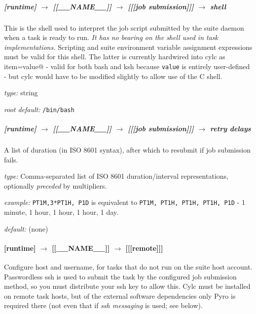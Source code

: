 \subparagraph[shell]{[runtime] $\rightarrow$ [[\_\_NAME\_\_]] $\rightarrow$ [[[job submission]]] $\rightarrow$ shell}
\label{JobSubShell}

This is the shell used to interpret the job script submitted by the suite
daemon when a task is ready to run.  {\em It has no bearing on the shell used
in task implementations.} Scripting and suite environment
variable assignment expressions must be valid for this shell. The
latter is currently hardwired into cylc as
\lstinline@export item=value@ - valid for both bash and ksh
because \lstinline=value= is entirely user-defined - but cylc would have
to be modified slightly to allow use of the C shell.

\begin{myitemize}
\item {\em type:} string
\item {\em root default:} \lstinline=/bin/bash=
\end{myitemize}

\subparagraph[retry delays]{[runtime] $\rightarrow$ [[\_\_NAME\_\_]] $\rightarrow$ [[[job submission]]] $\rightarrow$ retry delays}
\label{JobSubRefRetries}

A list of duration (in ISO 8601 syntax), after which to resubmit if job
submission fails.
\begin{myitemize}
    \item {\em type:} Comma-separated list of ISO 8601 duration/interval
        representations, optionally {\em preceded} by multipliers.
    \item {\em example:} \lstinline=PT1M,3*PT1H, P1D= is equivalent to
    \lstinline=PT1M, PT1H, PT1H, PT1H, P1D= - 1 minute, 1 hour, 1 hour, 1
    hour, 1 day.
    \item {\em default:} (none)
\end{myitemize}


\paragraph[{[[[}remote{]]]}]{[runtime] $\rightarrow$ [[\_\_NAME\_\_]] $\rightarrow$ [[[remote]]]}

Configure host and username, for tasks that do not run on the suite host
account. Passwordless ssh is used to submit the task by the configured
job submission method, so you must distribute your ssh key to allow
this. Cylc must be installed on remote task hosts, but of the external
software dependencies only Pyro is required there (not even that if {\em
ssh messaging} is used; see below).

